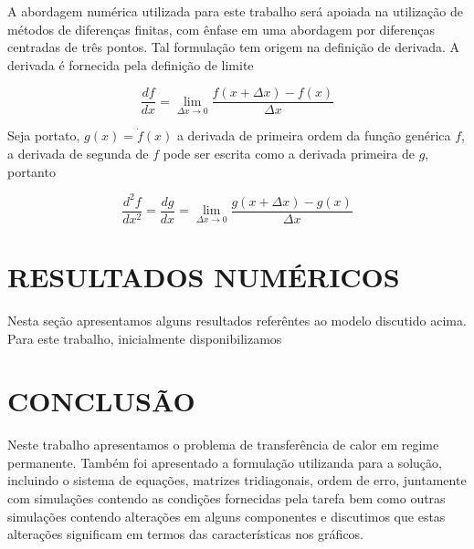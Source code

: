 \documentclass[a4paper, 12pt]{article}
\begin{document}
A abordagem numérica utilizada para este trabalho será apoiada na utilização de métodos de diferenças finitas, com ênfase em uma abordagem por diferenças centradas de três pontos. Tal formulação tem
origem na definição de derivada. A derivada é fornecida pela definição de limite \newline

\begin{equation}
  \label{f1}
  \frac{df}{dx} = \lim_{\Delta x \to 0} \frac{f(x + \Delta x) - f(x)}{\Delta x}
\end{equation}

Seja portato, $g(x) =  \dot{f}(x)$ a derivada de primeira ordem da função genérica $f$, a derivada de segunda de $f$ pode ser escrita como a derivada primeira de $g$, portanto 

\begin{equation}
  \label{f2}
  \frac{d^2 f}{dx^2} = \frac{dg}{dx} = \lim_{\Delta x \to 0} \frac{g(x + \Delta x) - g(x)}{\Delta x}
\end{equation}


\section{RESULTADOS NUMÉRICOS}

Nesta seção apresentamos alguns resultados referêntes ao modelo discutido acima. \newline
Para este trabalho, inicialmente disponibilizamos  

\section{CONCLUSÃO}

Neste trabalho apresentamos o problema de transferência de calor em regime 
permanente. Também foi apresentado a formulação utilizanda para a solução, incluindo o sistema de equações, matrizes tridiagonais, ordem de erro, juntamente com simulações contendo as condições fornecidas pela tarefa bem como outras simulações contendo alterações em alguns componentes e discutimos que estas alterações significam em termos das características nos gráficos. 
\end{document}
